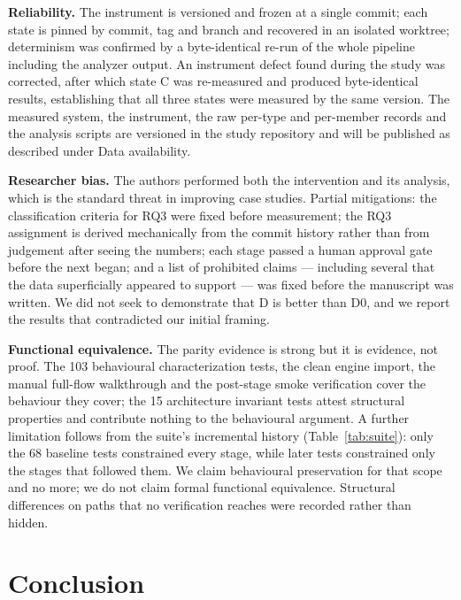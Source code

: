 \documentclass{sbc2019}%
\begin{document}
\medskip\noindent\textbf{Reliability.} The instrument is versioned and frozen at
a single commit; each state is pinned by commit, tag and branch and recovered in
an isolated worktree; determinism was confirmed by a byte-identical re-run of the
whole pipeline including the analyzer output. An instrument defect found during
the study was corrected, after which state C was re-measured and produced
byte-identical results, establishing that all three states were measured by the
same version. The measured system, the instrument, the raw per-type and
per-member records and the analysis scripts are versioned in the study
repository and will be published as described under Data availability.

\medskip\noindent\textbf{Researcher bias.} The authors performed both the
intervention and its analysis, which is the standard threat in improving case
studies. Partial mitigations: the classification criteria for RQ3 were fixed
before measurement; the RQ3 assignment is derived mechanically from the commit
history rather than from judgement after seeing the numbers; each stage passed a
human approval gate before the next began; and a list of prohibited claims ---
including several that the data superficially appeared to support --- was fixed
before the manuscript was written. We did not seek to demonstrate that D is
better than D0, and we report the results that contradicted our initial framing.

\medskip\noindent\textbf{Functional equivalence.} The parity evidence is strong
but it is evidence, not proof. The 103 behavioural characterization tests, the
clean engine import, the manual full-flow walkthrough and the post-stage smoke
verification cover the behaviour they cover; the 15 architecture invariant tests
attest structural properties and contribute nothing to the behavioural argument.
A further limitation follows from the suite's incremental history
(Table~\ref{tab:suite}): only the 68 baseline tests constrained every stage,
while later tests constrained only the stages that followed them. We claim behavioural preservation
for that scope and no more; we do not claim formal functional equivalence.
Structural differences on paths that no verification reaches were recorded rather
than hidden.


\FloatBarrier

\section{Conclusion}\label{sec:conclusion}
\end{document}
